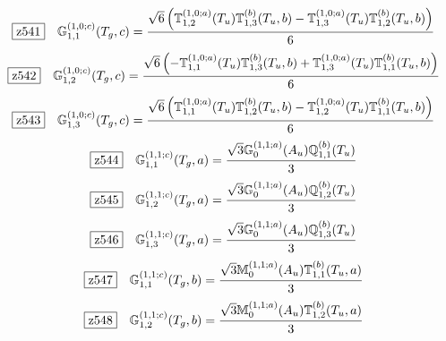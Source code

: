 \documentclass[fleqn,10pt,landscape]{jsarticle}
\begin{document}
\begin{dmath*}
\hspace*{3mm}\fbox{z541}\quad \mathbb{G}_{1,1}^{(1,0;c)}(T_{g},c)=\frac{\sqrt{6} \left(\mathbb{T}_{1,2}^{(1,0;a)}(T_{u}) \mathbb{T}_{1,3}^{(b)}(T_{u},b) - \mathbb{T}_{1,3}^{(1,0;a)}(T_{u}) \mathbb{T}_{1,2}^{(b)}(T_{u},b)\right)}{6}
\end{dmath*}
\begin{dmath*}
\hspace*{3mm}\fbox{z542}\quad \mathbb{G}_{1,2}^{(1,0;c)}(T_{g},c)=\frac{\sqrt{6} \left(- \mathbb{T}_{1,1}^{(1,0;a)}(T_{u}) \mathbb{T}_{1,3}^{(b)}(T_{u},b) + \mathbb{T}_{1,3}^{(1,0;a)}(T_{u}) \mathbb{T}_{1,1}^{(b)}(T_{u},b)\right)}{6}
\end{dmath*}
\begin{dmath*}
\hspace*{3mm}\fbox{z543}\quad \mathbb{G}_{1,3}^{(1,0;c)}(T_{g},c)=\frac{\sqrt{6} \left(\mathbb{T}_{1,1}^{(1,0;a)}(T_{u}) \mathbb{T}_{1,2}^{(b)}(T_{u},b) - \mathbb{T}_{1,2}^{(1,0;a)}(T_{u}) \mathbb{T}_{1,1}^{(b)}(T_{u},b)\right)}{6}
\end{dmath*}
\begin{dmath*}
\hspace*{3mm}\fbox{z544}\quad \mathbb{G}_{1,1}^{(1,1;c)}(T_{g},a)=\frac{\sqrt{3} \mathbb{G}_{0}^{(1,1;a)}(A_{u}) \mathbb{Q}_{1,1}^{(b)}(T_{u})}{3}
\end{dmath*}
\begin{dmath*}
\hspace*{3mm}\fbox{z545}\quad \mathbb{G}_{1,2}^{(1,1;c)}(T_{g},a)=\frac{\sqrt{3} \mathbb{G}_{0}^{(1,1;a)}(A_{u}) \mathbb{Q}_{1,2}^{(b)}(T_{u})}{3}
\end{dmath*}
\begin{dmath*}
\hspace*{3mm}\fbox{z546}\quad \mathbb{G}_{1,3}^{(1,1;c)}(T_{g},a)=\frac{\sqrt{3} \mathbb{G}_{0}^{(1,1;a)}(A_{u}) \mathbb{Q}_{1,3}^{(b)}(T_{u})}{3}
\end{dmath*}
\begin{dmath*}
\hspace*{3mm}\fbox{z547}\quad \mathbb{G}_{1,1}^{(1,1;c)}(T_{g},b)=\frac{\sqrt{3} \mathbb{M}_{0}^{(1,1;a)}(A_{u}) \mathbb{T}_{1,1}^{(b)}(T_{u},a)}{3}
\end{dmath*}
\begin{dmath*}
\hspace*{3mm}\fbox{z548}\quad \mathbb{G}_{1,2}^{(1,1;c)}(T_{g},b)=\frac{\sqrt{3} \mathbb{M}_{0}^{(1,1;a)}(A_{u}) \mathbb{T}_{1,2}^{(b)}(T_{u},a)}{3}
\end{dmath*}
\end{document}
